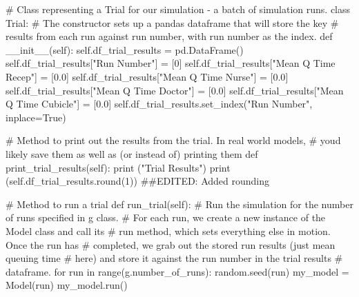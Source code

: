 \documentclass[
  letterpaper,
  DIV=11,
  numbers=noendperiod]{scrreprt}
\newenvironment{Shaded}{}{}
\newcommand{\BuiltInTok}[1]{\textcolor[rgb]{0.84,0.23,0.29}{#1}}
\newcommand{\CommentTok}[1]{\textcolor[rgb]{0.42,0.45,0.49}{#1}}
\newcommand{\ControlFlowTok}[1]{\textcolor[rgb]{0.84,0.23,0.29}{#1}}
\newcommand{\DecValTok}[1]{\textcolor[rgb]{0.00,0.36,0.77}{#1}}
\newcommand{\FloatTok}[1]{\textcolor[rgb]{0.00,0.36,0.77}{#1}}
\newcommand{\FunctionTok}[1]{\textcolor[rgb]{0.44,0.26,0.76}{#1}}
\newcommand{\KeywordTok}[1]{\textcolor[rgb]{0.84,0.23,0.29}{#1}}
\newcommand{\NormalTok}[1]{\textcolor[rgb]{0.14,0.16,0.18}{#1}}
\newcommand{\OperatorTok}[1]{\textcolor[rgb]{0.14,0.16,0.18}{#1}}
\newcommand{\StringTok}[1]{\textcolor[rgb]{0.01,0.18,0.38}{#1}}
\newcommand{\VariableTok}[1]{\textcolor[rgb]{0.89,0.38,0.04}{#1}}
\begin{document}
\begin{Shaded}
\begin{Highlighting}[]
\CommentTok{\# Class representing a Trial for our simulation {-} a batch of simulation runs.}
\KeywordTok{class}\NormalTok{ Trial:}
    \CommentTok{\# The constructor sets up a pandas dataframe that will store the key}
    \CommentTok{\# results from each run against run number, with run number as the index.}
    \KeywordTok{def}  \FunctionTok{\_\_init\_\_}\NormalTok{(}\VariableTok{self}\NormalTok{):}
        \VariableTok{self}\NormalTok{.df\_trial\_results }\OperatorTok{=}\NormalTok{ pd.DataFrame()}
        \VariableTok{self}\NormalTok{.df\_trial\_results[}\StringTok{"Run Number"}\NormalTok{] }\OperatorTok{=}\NormalTok{ [}\DecValTok{0}\NormalTok{]}
        \VariableTok{self}\NormalTok{.df\_trial\_results[}\StringTok{"Mean Q Time Recep"}\NormalTok{] }\OperatorTok{=}\NormalTok{ [}\FloatTok{0.0}\NormalTok{]}
        \VariableTok{self}\NormalTok{.df\_trial\_results[}\StringTok{"Mean Q Time Nurse"}\NormalTok{] }\OperatorTok{=}\NormalTok{ [}\FloatTok{0.0}\NormalTok{]}
        \VariableTok{self}\NormalTok{.df\_trial\_results[}\StringTok{"Mean Q Time Doctor"}\NormalTok{] }\OperatorTok{=}\NormalTok{ [}\FloatTok{0.0}\NormalTok{]}
        \VariableTok{self}\NormalTok{.df\_trial\_results[}\StringTok{"Mean Q Time Cubicle"}\NormalTok{] }\OperatorTok{=}\NormalTok{ [}\FloatTok{0.0}\NormalTok{]}
        \VariableTok{self}\NormalTok{.df\_trial\_results.set\_index(}\StringTok{"Run Number"}\NormalTok{, inplace}\OperatorTok{=}\VariableTok{True}\NormalTok{)}

    \CommentTok{\# Method to print out the results from the trial.  In real world models,}
    \CommentTok{\# you\textquotesingle{}d likely save them as well as (or instead of) printing them}
    \KeywordTok{def}\NormalTok{ print\_trial\_results(}\VariableTok{self}\NormalTok{):}
        \BuiltInTok{print}\NormalTok{ (}\StringTok{"Trial Results"}\NormalTok{)}
        \BuiltInTok{print}\NormalTok{ (}\VariableTok{self}\NormalTok{.df\_trial\_results.}\BuiltInTok{round}\NormalTok{(}\DecValTok{1}\NormalTok{)) }\CommentTok{\#\#EDITED: Added rounding}

    \CommentTok{\# Method to run a trial}
    \KeywordTok{def}\NormalTok{ run\_trial(}\VariableTok{self}\NormalTok{):}
        \CommentTok{\# Run the simulation for the number of runs specified in g class.}
        \CommentTok{\# For each run, we create a new instance of the Model class and call its}
        \CommentTok{\# run method, which sets everything else in motion.  Once the run has}
        \CommentTok{\# completed, we grab out the stored run results (just mean queuing time}
        \CommentTok{\# here) and store it against the run number in the trial results}
        \CommentTok{\# dataframe.}
        \ControlFlowTok{for}\NormalTok{ run }\KeywordTok{in} \BuiltInTok{range}\NormalTok{(g.number\_of\_runs):}
\NormalTok{            random.seed(run)}
\NormalTok{            my\_model }\OperatorTok{=}\NormalTok{ Model(run)}
\NormalTok{            my\_model.run()}


\end{Highlighting}
\end{Shaded}
\end{document}

